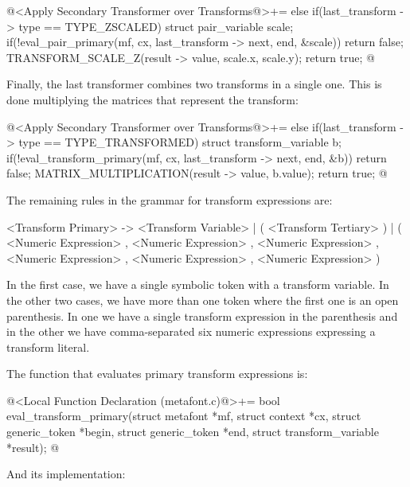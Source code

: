 \iniciocodigo
@<Apply Secondary Transformer over Transforms@>+=
else if(last_transform -> type == TYPE_ZSCALED){
  struct pair_variable scale;
  if(!eval_pair_primary(mf, cx, last_transform -> next, end, &scale))
    return false;
  TRANSFORM_SCALE_Z(result -> value, scale.x, scale.y);
  return true;
}
@
\fimcodigo

Finally, the last transformer combines two transforms in a single
one. This is done multiplying the matrices that represent the
transform:

\iniciocodigo
@<Apply Secondary Transformer over Transforms@>+=
else if(last_transform -> type == TYPE_TRANSFORMED){
  struct transform_variable b;
  if(!eval_transform_primary(mf, cx, last_transform -> next, end, &b))
    return false;
  MATRIX_MULTIPLICATION(result -> value, b.value);
  return true;
}
@
\fimcodigo


The remaining rules in the grammar for transform expressions are:

\alinhaverbatim
<Transform Primary> -> <Transform Variable> |
                       ( <Transform Tertiary> ) |
                       ( <Numeric Expression> , <Numeric Expression> ,
                         <Numeric Expression> , <Numeric Expression> ,
                         <Numeric Expression> , <Numeric Expression> )
\alinhanormal

In the first case, we have a single symbolic token with a transform
variable. In the other two cases, we have more than one token where
the first one is an open parenthesis. In one we have a single
transform expression in the parenthesis and in the other we have
comma-separated six numeric expressions expressing a transform
literal.

The function that evaluates primary transform expressions is:

\iniciocodigo
@<Local Function Declaration (metafont.c)@>+=
bool eval_transform_primary(struct metafont *mf, struct context *cx,
                            struct generic_token *begin,
                            struct generic_token *end,
                            struct transform_variable *result);
@
\fimcodigo

And its implementation:

